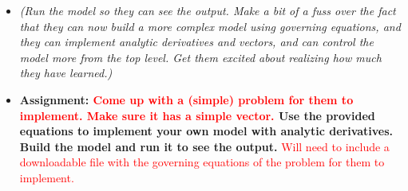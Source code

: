 \documentclass[12pt, letterpaper]{article}
\begin{document}
\begin{itemize}
\begin{itemize}
			\item \textit{(Run the model so they can see the output. Make a bit of a fuss over the fact that they can now build a more complex model using governing equations, and they can implement analytic derivatives and vectors, and can control the model more from the top level. Get them excited about realizing how much they have learned.)}
			\item \textbf{Assignment: \textcolor{red}{Come up with a (simple) problem for them to implement. Make sure it has a simple vector.} Use the provided equations to implement your own model with analytic derivatives. Build the model and run it to see the output.} \textcolor{red}{Will need to include a downloadable file with the governing equations of the problem for them to implement.}
		\end{itemize}
		

\end{itemize}
\end{document}

